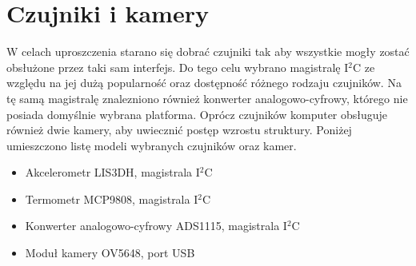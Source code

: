 \section{Czujniki i kamery}

W celach uproszczenia starano się dobrać czujniki tak aby wszystkie mogły zostać obsłużone przez taki sam interfejs. Do tego celu wybrano magistralę I$^2$C ze względu na jej dużą popularność oraz dostępność różnego rodzaju czujników. Na tę samą magistralę znalezniono również konwerter analogowo-cyfrowy, którego nie posiada domyślnie wybrana platforma. Oprócz czujników komputer obsługuje również dwie kamery, aby uwiecznić postęp wzrostu struktury. Poniżej umieszczono listę modeli wybranych czujników oraz kamer.
\begin{itemize}
	\item Akcelerometr LIS3DH, magistrala I$^2$C
	\item Termometr MCP9808, magistrala I$^2$C
	\item Konwerter analogowo-cyfrowy ADS1115, magistrala I$^2$C
	\item Moduł kamery OV5648, port USB
	
\end{itemize}

